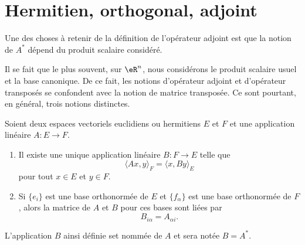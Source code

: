 \section{Hermitien, orthogonal, adjoint}


\begin{normaltext}      \label{NORMooWGEJooCtGtqZ}
	Une des choses à retenir de la définition de l'opérateur adjoint est que la notion de \( A^*\) dépend du produit scalaire considéré.

	Il se fait que le plus souvent, sur \( \eR^n\), nous considérons le produit scalaire usuel et la base canonique. De ce fait, les notions d'opérateur adjoint et d'opérateur transposés se confondent avec la notion de matrice transposée. Ce sont pourtant, en général, trois notions distinctes.
\end{normaltext}

\begin{propositionDef}\label{DEFooROVNooFlTbSK}
	Soient deux espaces vectoriels euclidiens ou hermitiens \( E\) et \( F\) et une application linéaire \( A\colon E\to F\).
	\begin{enumerate}
		\item       \label{ITEMooRUZWooSZgGnf}
		      Il existe une unique application linéaire \( B\colon F\to E\) telle que
		      \begin{equation}        \label{EQooHWYKooFzAGgB}
			      \langle Ax, y\rangle_F=\langle x, By\rangle_E
		      \end{equation}
		      pour tout \( x\in E\) et \( y\in F\).
		\item   \label{ITEMooXXEUooPtfPKY}
		      Si \( \{ e_i \}\) est une base orthonormée de \( E\) et \( \{ f_{\alpha} \}\) est une base orthonormée de \( F\), alors la matrice de \( A\) et \( B\) pour ces bases sont liées par
		      \begin{equation}       \label{EQooUSNVooQtRNGL}
			      B_{i\alpha}=A_{\alpha i}.
		      \end{equation}
	\end{enumerate}
	L'application \( B\) ainsi définie set nommée  de \( A\) et sera notée \( B=A^*\).
\end{propositionDef}

